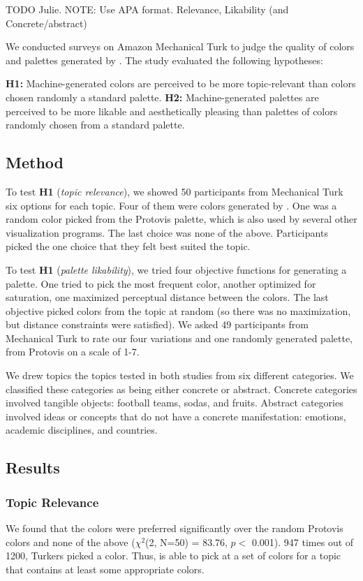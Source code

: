 TODO Julie. NOTE: Use APA format.
Relevance, Likability (and Concrete/abstract)

We conducted surveys on Amazon Mechanical Turk to judge the quality of colors and palettes generated by \system. The study evaluated the following hypotheses:

\textbf{H1:} Machine-generated colors are perceived to be more topic-relevant than colors chosen randomly a standard palette.
\textbf{H2:} Machine-generated palettes are perceived to be more likable and aesthetically pleasing than palettes of colors randomly chosen from a standard palette. 

\subsection{Method}
To test \textbf{H1} (\textit{topic relevance}), we showed 50 participants from Mechanical Turk six options for each topic. Four of them were colors generated by \system. One was a random color picked from the Protovis palette, which is also used by several other visualization programs. The last choice was none of the above. Participants picked the one choice that they felt best suited the topic.

To test \textbf{H1} (\textit{palette likability}), we tried four objective functions for generating a palette. One tried to pick the most frequent color, another optimized for saturation, one maximized perceptual distance between the colors. The last objective picked colors from the topic at random (so there was no maximization, but distance constraints were satisfied). 
We asked 49 participants from Mechanical Turk to rate our four variations and one randomly generated palette, from Protovis on a scale of 1-7.

We drew topics the topics tested in both studies from six different categories. We classified these categories as being either concrete or abstract. Concrete categories involved tangible objects: football teams, sodas, and fruits. Abstract categories involved ideas or concepts that do not have a concrete manifestation: emotions, academic disciplines, and countries. 

\subsection{Results}
\subsubsection{Topic Relevance} 
We found that the \system colors were preferred significantly over the random Protovis colors and none of the above ($\chi^2$(2, N=50) = 83.76, $p <$ 0.001). 947 times out of 1200, Turkers picked a \system color.  Thus, \system is able to pick at a set of colors for a topic that contains at least some appropriate colors.

